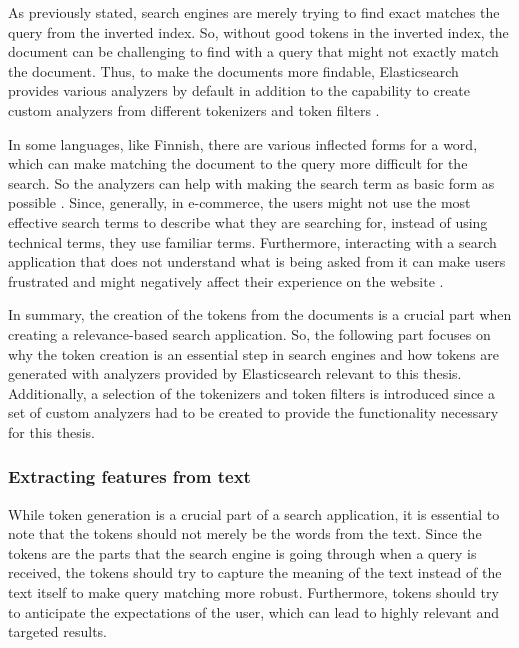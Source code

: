 As previously stated, search engines are merely trying to find exact matches the query from the
inverted index. 
So, without good tokens in the inverted index,
the document can be challenging to find with a query that might not exactly match the document.
Thus, to make the documents more findable, Elasticsearch provides various analyzers by default in addition to
the capability to create custom analyzers from different tokenizers and token filters 
\cite{relevantSearch}.


In some languages, like Finnish, there are various inflected forms for a word, which can make
matching the document to the query more difficult for the search.
So the analyzers can help with making the search term as basic form as possible \cite{relevantSearch}.
Since, generally, in e-commerce, the users might not use the most effective search terms to describe
what they are searching for, instead of using technical terms, they use familiar terms.
Furthermore, interacting with a search application that does not understand what is being asked from it
can make users frustrated and might negatively affect their experience on the website \cite{relevantSearch}.

In summary, the creation of the tokens from the documents is a crucial part when creating a relevance-based 
search application. 
So, the following part focuses on why the token creation is an essential step in search engines and 
how tokens are generated with analyzers provided by Elasticsearch relevant to this thesis.
Additionally, a selection of the tokenizers and token filters is introduced since a set of custom
analyzers had to be created to provide the functionality necessary for this thesis.

\subsubsection{Extracting features from text}
\label{ss:extrackingFeatures}

While token generation is a crucial part of a search application, it is essential to note that the tokens should not 
merely be the words from the text.
Since the tokens are the parts that the search engine is going through when a query is received, the tokens
should try to capture the meaning of the text instead of the text itself to make query matching more robust.
Furthermore, tokens should try to anticipate the expectations of the user, which can lead to 
highly relevant and targeted results.
\cite{relevantSearch}

